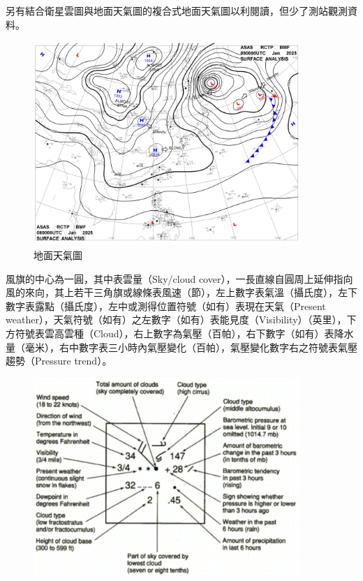\documentclass[a4paper,12pt]{report}
\begin{document}
\begin{itemize}
另有結合衛星雲圖與地面天氣圖的複合式地面天氣圖以利閱讀，但少了測站觀測資料。
\bct\begin{figure}[H]\ctr\includegraphics[width=0.9\textwidth]{FI04.png}\caption{地面天氣圖}\end{figure}\FB\ect
{}
風旗的中心為一圓，其中表雲量（Sky/cloud cover），一長直線自圓周上延伸指向風的來向，其上若干三角旗或線條表風速（節），左上數字表氣溫（攝氏度），左下數字表露點（攝氏度），左中或測得位置符號（如有）表現在天氣（Present weather），天氣符號（如有）之左數字（如有）表能見度（Visibility）（英里），下方符號表雲高雲種（Cloud），右上數字為氣壓（百帕），右下數字（如有）表降水量（毫米），右中數字表三小時內氣壓變化（百帕），氣壓變化數字右之符號表氣壓趨勢（Pressure trend）。
\bct\begin{figure}[H]\ctr\includegraphics[width=0.9\textwidth]{station_symbol.jpg}\end{figure}\FB\ect

\end{itemize}
\end{document}

